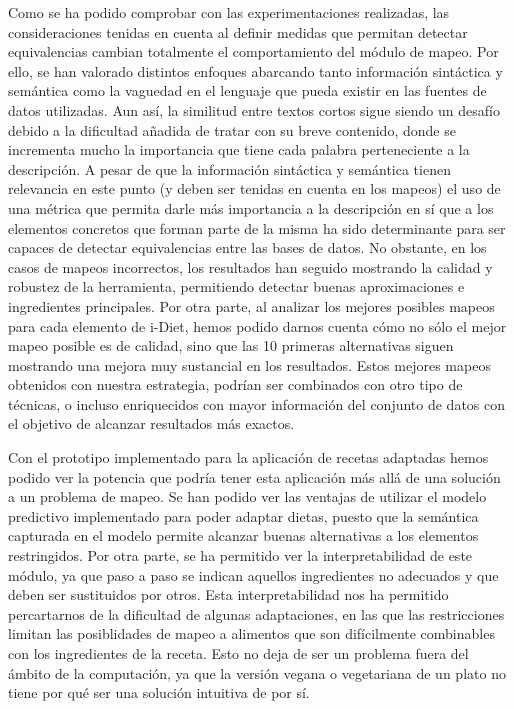 Como se ha podido comprobar con las experimentaciones realizadas, las consideraciones tenidas en cuenta al definir medidas que permitan detectar equivalencias cambian totalmente el comportamiento del módulo de mapeo. Por ello, se han valorado distintos enfoques abarcando tanto información sintáctica y semántica como la vaguedad en el lenguaje que pueda existir en las fuentes de datos utilizadas. Aun así, la similitud entre textos cortos sigue siendo un desafío debido a la dificultad añadida de tratar con su breve contenido, donde se incrementa mucho la importancia que tiene cada palabra perteneciente a la descripción. A pesar de que la información sintáctica y semántica tienen relevancia en este punto (y deben ser tenidas en cuenta en los mapeos) el uso de una métrica que permita darle más importancia a la descripción en sí que a los elementos concretos que forman parte de la misma ha sido determinante para ser capaces de detectar equivalencias entre las bases de datos. No obstante, en los casos de mapeos incorrectos, los resultados han seguido mostrando la calidad y robustez de la herramienta, permitiendo detectar buenas aproximaciones e ingredientes principales. Por otra parte, al analizar los mejores posibles mapeos para cada elemento de i-Diet, hemos podido darnos cuenta cómo no sólo el mejor mapeo posible es de calidad, sino que las 10 primeras alternativas siguen mostrando una mejora muy sustancial en los resultados. Estos mejores mapeos obtenidos con nuestra estrategia, podrían ser combinados con otro tipo de técnicas, o incluso enriquecidos con mayor información del conjunto de datos con el objetivo de alcanzar resultados más exactos.

Con el prototipo implementado para la aplicación de recetas adaptadas hemos podido ver la potencia que podría tener esta aplicación más allá de una solución a un problema de mapeo. Se han podido ver las ventajas de utilizar el modelo predictivo implementado para poder adaptar dietas, puesto que la semántica capturada en el modelo permite alcanzar buenas alternativas a los elementos restringidos. Por otra parte, se ha permitido ver la interpretabilidad de este módulo, ya que paso a paso se indican aquellos ingredientes no adecuados y que deben ser sustituidos por otros. Esta interpretabilidad nos ha permitido percartarnos de la dificultad de algunas adaptaciones, en las que las restricciones limitan las posiblidades de mapeo a alimentos que son difícilmente combinables con los ingredientes de la receta. Esto no deja de ser un problema fuera del ámbito de la computación, ya que la versión vegana o vegetariana de un plato no tiene por qué ser una solución intuitiva de por sí.


